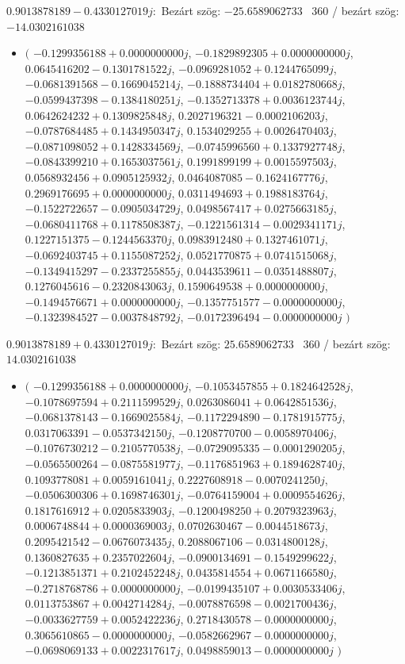 \documentclass[14pt,a4paper]{article}
\begin{document}
$0.9013878189-0.4330127019j$:\
Bezárt szög: $-25.6589062733$ \
360 / bezárt szög: $-14.0302161038$\
\begin{itemize}
\item
$\big($
$-0.1299356188+0.0000000000j$, $-0.1829892305+0.0000000000j$, $0.0645416202-0.1301781522j$, $-0.0969281052+0.1244765099j$, $-0.0681391568-0.1669045214j$, $-0.1888734404+0.0182780668j$, $-0.0599437398-0.1384180251j$, $-0.1352713378+0.0036123744j$, $0.0642624232+0.1309825848j$, $0.2027196321-0.0002106203j$, $-0.0787684485+0.1434950347j$, $0.1534029255+0.0026470403j$, $-0.0871098052+0.1428334569j$, $-0.0745996560+0.1337927748j$, $-0.0843399210+0.1653037561j$, $0.1991899199+0.0015597503j$, $0.0568932456+0.0905125932j$, $0.0464087085-0.1624167776j$, $0.2969176695+0.0000000000j$, $0.0311494693+0.1988183764j$, $-0.1522722657-0.0905034729j$, $0.0498567417+0.0275663185j$, $-0.0680411768+0.1178508387j$, $-0.1221561314-0.0029341171j$, $0.1227151375-0.1244563370j$, $0.0983912480+0.1327461071j$, $-0.0692403745+0.1155087252j$, $0.0521770875+0.0741515068j$, $-0.1349415297-0.2337255855j$, $0.0443539611-0.0351488807j$, $0.1276045616-0.2320843063j$, $0.1590649538+0.0000000000j$, $-0.1494576671+0.0000000000j$, $-0.1357751577-0.0000000000j$, $-0.1323984527-0.0037848792j$, $-0.0172396494-0.0000000000j$
$\big)$
\end{itemize}
$0.9013878189+0.4330127019j$:\
Bezárt szög: $25.6589062733$ \
360 / bezárt szög: $14.0302161038$\
\begin{itemize}
\item
$\big($
$-0.1299356188+0.0000000000j$, $-0.1053457855+0.1824642528j$, $-0.1078697594+0.2111599529j$, $0.0263086041+0.0642851536j$, $-0.0681378143-0.1669025584j$, $-0.1172294890-0.1781915775j$, $0.0317063391-0.0537342150j$, $-0.1208770700-0.0058970406j$, $-0.1076730212-0.2105770538j$, $-0.0729095335-0.0001290205j$, $-0.0565500264-0.0875581977j$, $-0.1176851963+0.1894628740j$, $0.1093778081+0.0059161041j$, $0.2227608918-0.0070241250j$, $-0.0506300306+0.1698746301j$, $-0.0764159004+0.0009554626j$, $0.1817616912+0.0205833903j$, $-0.1200498250+0.2079323963j$, $0.0006748844+0.0000369003j$, $0.0702630467-0.0044518673j$, $0.2095421542-0.0676073435j$, $0.2088067106-0.0314800128j$, $0.1360827635+0.2357022604j$, $-0.0900134691-0.1549299622j$, $-0.1213851371+0.2102452248j$, $0.0435814554+0.0671166580j$, $-0.2718768786+0.0000000000j$, $-0.0199435107+0.0030533406j$, $0.0113753867+0.0042714284j$, $-0.0078876598-0.0021700436j$, $-0.0033627759+0.0052422236j$, $0.2718430578-0.0000000000j$, $0.3065610865-0.0000000000j$, $-0.0582662967-0.0000000000j$, $-0.0698069133+0.0022317617j$, $0.0498859013-0.0000000000j$
$\big)$
\end{itemize}
\end{document}
